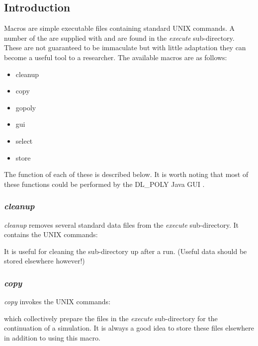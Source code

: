 \label{macros}
\subsection*{Introduction}

Macros are simple executable files containing standard UNIX
commands.  A number of the are supplied with \D and are found in
the {\em execute} sub-directory.  These are
not guaranteed to be immaculate but with little adaptation they
can become a useful tool to a researcher.  The available macros
are as follows:

{\sl
\begin{itemize}
\item cleanup
\item copy
\item gopoly
\item gui
\item select
\item store
\end{itemize}
}

\noindent The function of each of these is described below.  It is
worth noting that most of these functions could be performed by the
DL\_POLY Java GUI \cite{smith-gui}.

\subsubsection*{{\sl cleanup}}

{\sl cleanup} removes several standard data files from the {\em
execute} sub-directory.  It contains the UNIX
commands:



\noindent  It is useful for cleaning the sub-directory
up after a run. (Useful data should be stored elsewhere however!)

\subsubsection*{{\sl copy}}

{\sl copy} invokes the UNIX commands:



\noindent which collectively prepare the \D files in the {\em execute}
sub-directory for the continuation of a simulation.
It is always a good idea to store these files elsewhere in addition to using this macro.

